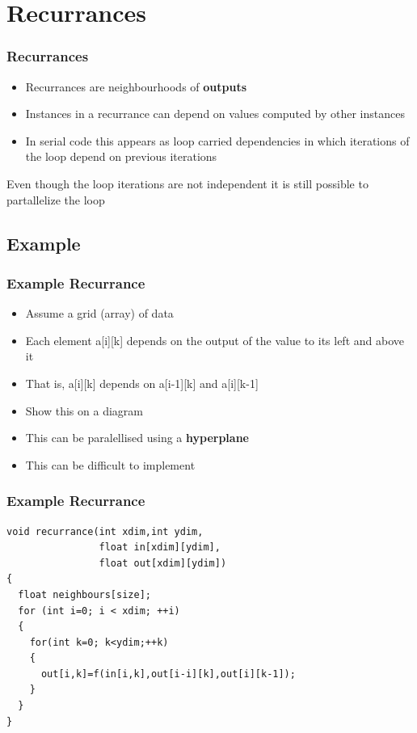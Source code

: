 \documentclass{beamer}
\begin{document}
\section{Recurrances}
\begin{frame}
\frametitle{Recurrances}
    \begin{itemize}
      \item Recurrances are neighbourhoods of \textbf{outputs}
      \item Instances in a recurrance can depend on values computed by other instances
      \item In serial code this appears as loop carried dependencies in which iterations of the loop depend on previous iterations
    \end{itemize}
Even though the loop iterations are not independent it is still possible to partallelize the loop
\end{frame}
\subsection{Example}
\begin{frame}
\frametitle{Example Recurrance}
\begin{itemize}
	\item Assume a grid (array) of data
	\item Each element a[i][k] depends on the output of the value to its left and above it
	\item That is, a[i][k] depends on a[i-1][k] and a[i][k-1]
	\item Show this on a diagram
	\item This can be paralellised using a \textbf{hyperplane}
	\item This can be difficult to implement
\end{itemize}
\end{frame}
\begin{frame}[fragile=singleslide]
	\frametitle{Example Recurrance}
\begin{lstlisting}
void recurrance(int xdim,int ydim, 
                float in[xdim][ydim], 
                float out[xdim][ydim])
{
  float neighbours[size];
  for (int i=0; i < xdim; ++i)
  {
    for(int k=0; k<ydim;++k)
    {
      out[i,k]=f(in[i,k],out[i-i][k],out[i][k-1]);
    }
  }
}
\end{lstlisting}
\end{frame}
\end{document}
